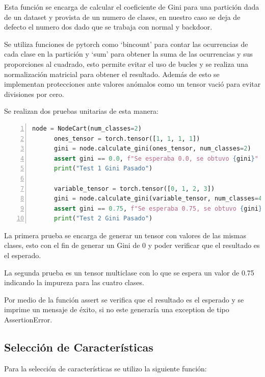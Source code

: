 \documentclass[12pt,a4paper]{article}
\begin{document}
Esta función se encarga de calcular el coeficiente de Gini para una partición dada de un dataset y provista de un
numero de clases, en nuestro caso se deja de defecto el numero dos dado que se trabaja con normal y backdoor.

Se utiliza funciones de pytorch como `bincount' para contar las ocurrencias de cada clase en la partición y `sum' para obtener la suma de las ocurrencias
y sus proporciones al cuadrado, esto permite evitar el uso de bucles y se realiza una normalización matricial para obtener el resultado.
Además de esto se implementan protecciones ante valores anómalos como un tensor vació para evitar divisiones por cero.

Se realizan dos pruebas unitarias de esta manera:

    \begin{lstlisting}[language=Python, numbers=left,label={lst:lstlisting2}, basicstyle=\ttfamily\small]
      node = NodeCart(num_classes=2)
      ones_tensor = torch.tensor([1, 1, 1, 1])
      gini = node.calculate_gini(ones_tensor, num_classes=2)
      assert gini == 0.0, f"Se esperaba 0.0, se obtuvo {gini}"
      print("Test 1 Gini Pasado")

      variable_tensor = torch.tensor([0, 1, 2, 3])
      gini = node.calculate_gini(variable_tensor, num_classes=4)
      assert gini == 0.75, f"Se esperaba 0.75, se obtuvo {gini}"
      print("Test 2 Gini Pasado")
    \end{lstlisting}

La primera prueba se encarga de generar un tensor con valores de las mismas clases, esto con el fin de generar un Gini de 0
y poder verificar que el resultado es el esperado.

La segunda prueba es un tensor multiclase con lo que se espera un valor de 0.75 indicando la impureza para las cuatro clases.

Por medio de la función assert se verifica que el resultado es el esperado y se imprime un mensaje de éxito, si no este generaría
una exception de tipo AssertionError.

\subsection{Selección de Características}\label{subsec:seleccion-de-caracteristicas}

Para la selección de características se utilizo la siguiente función:
\end{document}
